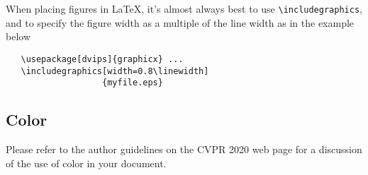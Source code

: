 \documentclass[10pt,twocolumn,letterpaper]{article}
\begin{document}
When placing figures in \LaTeX, it's almost always best to use
\verb+\includegraphics+, and to specify the  figure width as a multiple of
the line width as in the example below
{\small\begin{verbatim}
   \usepackage[dvips]{graphicx} ...
   \includegraphics[width=0.8\linewidth]
                   {myfile.eps}
\end{verbatim}
}


\subsection{Color}

Please refer to the author guidelines on the CVPR 2020 web page for a discussion
of the use of color in your document.




{\small


}
\end{document}

